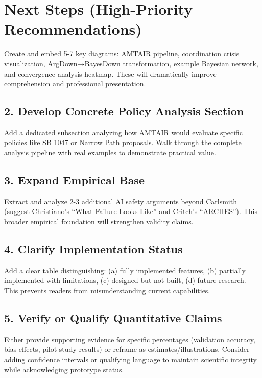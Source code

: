 \documentclass[
  11pt,
  letterpaper,
]{book}
\begin{document}
\section{Next Steps (High-Priority
Recommendations)}\label{next-steps-high-priority-recommendations}

Create and embed 5-7 key diagrams: AMTAIR pipeline, coordination crisis
visualization, ArgDown→BayesDown transformation, example Bayesian
network, and convergence analysis heatmap. These will dramatically
improve comprehension and professional presentation.

\subsection{2. Develop Concrete Policy Analysis
Section}\label{develop-concrete-policy-analysis-section}

Add a dedicated subsection analyzing how AMTAIR would evaluate specific
policies like SB 1047 or Narrow Path proposals. Walk through the
complete analysis pipeline with real examples to demonstrate practical
value.

\subsection{3. Expand Empirical Base}\label{expand-empirical-base}

Extract and analyze 2-3 additional AI safety arguments beyond Carlsmith
(suggest Christiano's ``What Failure Looks Like'' and Critch's
``ARCHES''). This broader empirical foundation will strengthen validity
claims.

\subsection{4. Clarify Implementation
Status}\label{clarify-implementation-status}

Add a clear table distinguishing: (a) fully implemented features, (b)
partially implemented with limitations, (c) designed but not built, (d)
future research. This prevents readers from misunderstanding current
capabilities.

\subsection{5. Verify or Qualify Quantitative
Claims}\label{verify-or-qualify-quantitative-claims}

Either provide supporting evidence for specific percentages (validation
accuracy, bias effects, pilot study results) or reframe as
estimates/illustrations. Consider adding confidence intervals or
qualifying language to maintain scientific integrity while acknowledging
prototype status.
\end{document}
